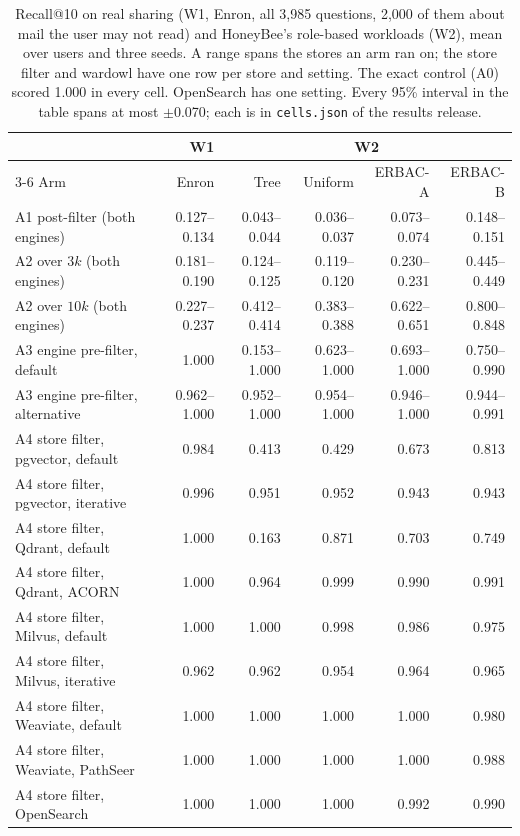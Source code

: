 \begin{table}[t]
\caption{Recall@10 on real sharing (W1, Enron, all 3{,}985 questions, 2{,}000 of them about mail the user may not read) and HoneyBee's role-based workloads (W2), mean over users and three seeds. A range spans the stores an arm ran on; the store filter and wardowl have one row per store and setting. The exact control (A0) scored 1.000 in every cell. OpenSearch has one setting. Every 95\% interval in the table spans at most $\pm$0.070; each is in \texttt{cells.json} of the results release.}
\label{tab:quality}
\footnotesize
\begin{tabular}{@{}lrrrrr@{}}
\toprule
 & W1 & \multicolumn{4}{c}{W2} \\ \cmidrule(l){3-6}
Arm & Enron & Tree & Uniform & ERBAC-A & ERBAC-B \\
\midrule
A1 post-filter (both engines) & 0.127--0.134 & 0.043--0.044 & 0.036--0.037 & 0.073--0.074 & 0.148--0.151 \\
A2 over $3k$ (both engines) & 0.181--0.190 & 0.124--0.125 & 0.119--0.120 & 0.230--0.231 & 0.445--0.449 \\
A2 over $10k$ (both engines) & 0.227--0.237 & 0.412--0.414 & 0.383--0.388 & 0.622--0.651 & 0.800--0.848 \\
A3 engine pre-filter, default & 1.000 & 0.153--1.000 & 0.623--1.000 & 0.693--1.000 & 0.750--0.990 \\
A3 engine pre-filter, alternative & 0.962--1.000 & 0.952--1.000 & 0.954--1.000 & 0.946--1.000 & 0.944--0.991 \\
A4 store filter, pgvector, default & 0.984 & 0.413 & 0.429 & 0.673 & 0.813 \\
A4 store filter, pgvector, iterative & 0.996 & 0.951 & 0.952 & 0.943 & 0.943 \\
A4 store filter, Qdrant, default & 1.000 & 0.163 & 0.871 & 0.703 & 0.749 \\
A4 store filter, Qdrant, ACORN & 1.000 & 0.964 & 0.999 & 0.990 & 0.991 \\
A4 store filter, Milvus, default & 1.000 & 1.000 & 0.998 & 0.986 & 0.975 \\
A4 store filter, Milvus, iterative & 0.962 & 0.962 & 0.954 & 0.964 & 0.965 \\
A4 store filter, Weaviate, default & 1.000 & 1.000 & 1.000 & 1.000 & 0.980 \\
A4 store filter, Weaviate, PathSeer & 1.000 & 1.000 & 1.000 & 1.000 & 0.988 \\
A4 store filter, OpenSearch & 1.000 & 1.000 & 1.000 & 0.992 & 0.990 \\

\end{tabular}
\end{table}

